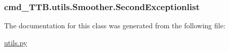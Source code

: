 \subsubsection[{\texorpdfstring{Second\+Exceptionlist}{SecondExceptionlist}}]{\setlength{\rightskip}{0pt plus 5cm}cmd\+\_\+\+T\+T\+B.\+utils.\+Smoother.\+Second\+Exceptionlist}\hypertarget{classcmd__TTB_1_1utils_1_1Smoother_a17a6be1aa09cfc3a8fe9fd690f83612f}{}\label{classcmd__TTB_1_1utils_1_1Smoother_a17a6be1aa09cfc3a8fe9fd690f83612f}


The documentation for this class was generated from the following file\+:\begin{DoxyCompactItemize}
\item 
\hyperlink{utils_8py}{utils.\+py}\end{DoxyCompactItemize}
